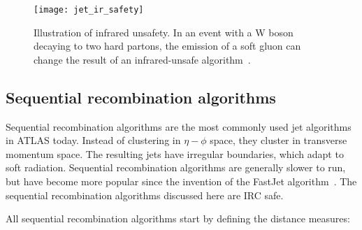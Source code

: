 \begin{figure}[!ht]
    \centering
\texttt{[image: jet\_ir\_safety]}
\caption{Illustration of infrared unsafety.
In an event with a W boson decaying to two hard partons, the emission of a soft gluon can change the result of an infrared-unsafe algorithm~\cite{jet-jetography}.}
\label{fig:jet_ir_safety}
\end{figure}

\subsection{Sequential recombination algorithms}\label{subsec:jet_seq_recombination}

Sequential recombination algorithms are the most commonly used jet algorithms in ATLAS today.
Instead of clustering in $\eta-\phi$ space, they cluster in transverse momentum space.
The resulting jets have irregular boundaries, which adapt to soft radiation.
Sequential recombination algorithms are generally slower to run,
but have become more popular since the invention of the FastJet algorithm~\cite{jet-fastjet}.
The sequential recombination algorithms discussed here are IRC safe.

All sequential recombination algorithms start by defining the distance measures:

